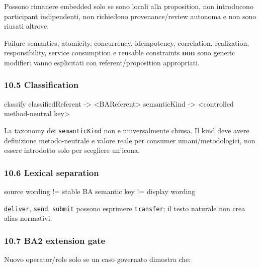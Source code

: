\documentclass[
  9pt,
  a4paper,
]{article}
\newenvironment{Shaded}{}{}
\newcommand{\NormalTok}[1]{#1}
\begin{document}
Possono rimanere embedded solo se sono locali alla proposition, non
introducono participant indipendenti, non richiedono provenance/review
autonoma e non sono riusati altrove.

Failure semantics, atomicity, concurrency, idempotency, correlation,
realization, responsibility, service consumption e reusable constraints
\textbf{non} sono generic modifier: vanno esplicitati con
referent/proposition appropriati.

\subsubsection{10.5 Classification}\label{classification}

\begin{Shaded}
\begin{Highlighting}[]
\NormalTok{classify}
\NormalTok{  classifiedReferent {-}\textgreater{} \textless{}BAReferent\textgreater{}}
\NormalTok{  semanticKind       {-}\textgreater{} \textless{}controlled method{-}neutral key\textgreater{}}
\end{Highlighting}
\end{Shaded}

La taxonomy dei \texttt{semanticKind} non e universalmente chiusa. Il
kind deve avere definizione metodo-neutrale e valore reale per consumer
umani/metodologici, non essere introdotto solo per scegliere un'icona.

\subsubsection{10.6 Lexical separation}\label{lexical-separation}

\begin{Shaded}
\begin{Highlighting}[]
\NormalTok{source wording != stable BA semantic key != display wording}
\end{Highlighting}
\end{Shaded}

\texttt{deliver}, \texttt{send}, \texttt{submit} possono esprimere
\texttt{transfer}; il testo naturale non crea alias normativi.

\subsubsection{10.7 BA2 extension gate}\label{ba2-extension-gate}

Nuovo operator/role solo se un caso governato dimostra che:
\end{document}
